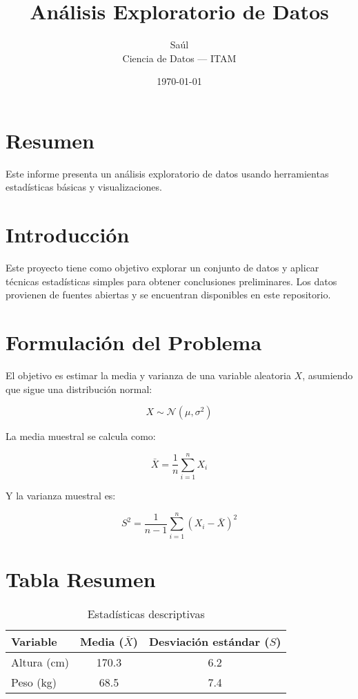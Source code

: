 \documentclass[a4paper,12pt]{article}
\title{Análisis Exploratorio de Datos}
\author{Saúl \\ Ciencia de Datos — ITAM}
\date{\today}
\begin{document}
\maketitle

\section*{Resumen}

Este informe presenta un análisis exploratorio de datos usando herramientas estadísticas básicas y visualizaciones.  

\section{Introducción}

Este proyecto tiene como objetivo explorar un conjunto de datos y aplicar técnicas estadísticas simples para obtener conclusiones preliminares. Los datos provienen de fuentes abiertas y se encuentran disponibles en este repositorio.

\section{Formulación del Problema}

El objetivo es estimar la media y varianza de una variable aleatoria \( X \), asumiendo que sigue una distribución normal:

\[
X \sim \mathcal{N}(\mu, \sigma^2)
\]

La media muestral se calcula como:

\[
\bar{X} = \frac{1}{n} \sum_{i=1}^n X_i
\]

Y la varianza muestral es:

\[
S^2 = \frac{1}{n - 1} \sum_{i=1}^n (X_i - \bar{X})^2
\]

\section{Tabla Resumen}

\begin{table}[h!]
\centering
\begin{tabular}{@{}lcc@{}}
\toprule
Variable & Media (\(\bar{X}\)) & Desviación estándar (\(S\)) \\
\midrule
Altura (cm) & 170.3 & 6.2 \\
Peso (kg)   & 68.5  & 7.4 \\
\bottomrule
\end{tabular}
\caption{Estadísticas descriptivas}
\end{table}
\end{document}
